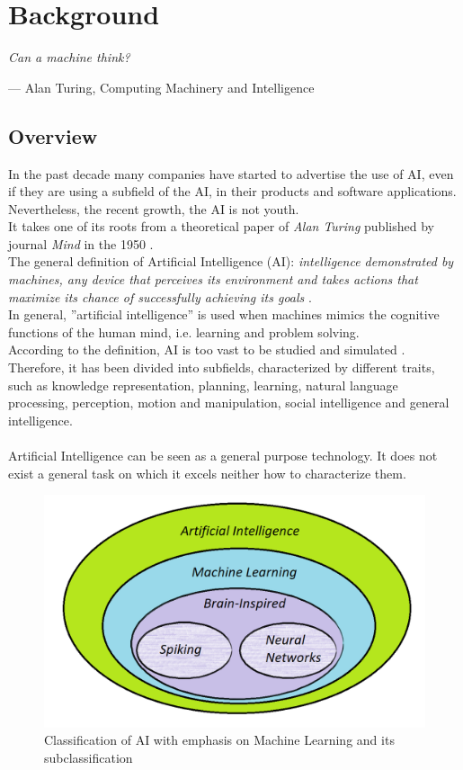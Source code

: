 \chapter{Background}

\epigraph{ \textit{Can a machine think?}}{--- \textup{Alan Turing}, Computing Machinery and Intelligence}

\section{Overview}
In the past decade many companies have started to advertise the use of AI, even if they are using a subfield of the AI, in their products and software applications. Nevertheless, the recent growth,
the AI is not youth.\\ It takes one of its roots from a theoretical paper of \textit{Alan Turing} published by journal \textit{Mind} in the 1950 \cite{paper:36}.\\

The general definition of Artificial Intelligence (AI): \textit{intelligence demonstrated by machines, any device that perceives its environment and takes actions that maximize its chance of successfully achieving its goals}    \cite{book:1}.\\ In general, ''artificial intelligence'' is used when machines mimics the cognitive functions of the human mind, i.e. learning and problem solving.\\
According to the definition, AI is too vast to be studied and simulated \cite{book:1}. Therefore, it has been divided into subfields, characterized by different traits, such as knowledge representation, planning, learning, natural language processing, perception, motion and manipulation, social intelligence and general intelligence.\\\\

Artificial Intelligence can be seen as a general purpose technology. It does not exist a general task on which it excels neither how to characterize them.

\begin{figure}[H]
\centering
\captionsetup{justification=centering}
\includegraphics[scale=0.5]{./figure/ai_division.png}
\caption{Classification of AI with emphasis on Machine Learning and its subclassification}
\label{fig:aidiv}
\end{figure}

